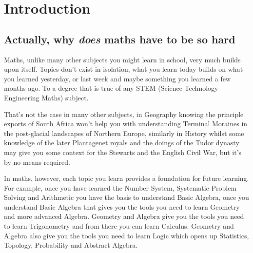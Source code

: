 \chapter{Introduction}

\minitoc

\section{Actually, why \emph{does} maths have to be so hard}
Maths, unlike many other subjects you might learn in school, very much builds upon itself.  Topics don't exist in isolation, what you learn today builds on what you learned yesterday, or last week and maybe something you learned a few months ago.  To a degree that is true of any STEM (Science Technology Engineering Maths) subject.

That's not the case in many other subjects, in Geography knowing the principle exports of South Africa won't help you with understanding Terminal Moraines in the post-glacial landscapes of Northern Europe, similarly in History whilst some knowledge of the later Plantagenet royals and the doings of the Tudor dynasty may give you some context for the Stewarts and the English Civil War, but it's by no means required.

In maths, however, each topic you learn provides a foundation for future learning.  For example, once you have learned the Number System, Systematic Problem Solving and Arithmetic you have the basis to understand Basic Algebra, once you understand Basic Algebra that gives you the tools you need to learn Geometry and more advanced Algebra.  Geometry and Algebra give you the tools you need to learn Trigonometry and from there you can learn Calculus.  Geometry and Algebra also give you the tools you need to learn Logic which opens up Statistics, Topology, Probability and Abstract Algebra.


